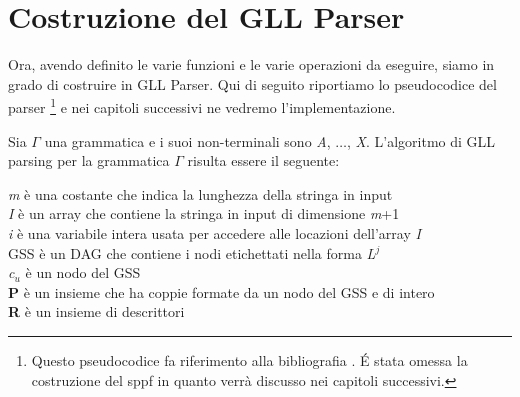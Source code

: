 \section{Costruzione del GLL Parser}\label{algoritmoIntero}
Ora, avendo definito le varie funzioni e le varie operazioni da eseguire, siamo in grado di costruire in GLL Parser. Qui di seguito riportiamo lo pseudocodice del parser \footnote{Questo pseudocodice fa riferimento alla bibliografia \cite{pubblicazione: scott}. \'E stata omessa la costruzione del sppf in quanto verrà discusso nei capitoli successivi.} e nei capitoli successivi ne vedremo l'implementazione.\par 
\vspace{0.2cm}
\noindent Sia $\Gamma$ una grammatica e i suoi non-terminali sono \textit{A}, $\dots$, \textit{X}. L'algoritmo di GLL parsing per la grammatica $\Gamma$ risulta essere il seguente:\par
\vspace{0.5cm}
\noindent \textit{m} è una costante che indica la lunghezza della stringa in input\\
\textit{I} è un array che contiene la stringa in input di dimensione \textit{m}+1\\
\textit{i} è una variabile intera usata per accedere alle locazioni dell'array \textit{I}\\
GSS è un DAG che contiene i nodi etichettati nella forma \textit{L$^{j}$}\\
\textit{c}$_u$ è un nodo del GSS\\
\textbf{P} è un insieme che ha coppie formate da un nodo del GSS e di intero\\
\textbf{R} è un insieme di descrittori \par
\vspace{0.5cm}


